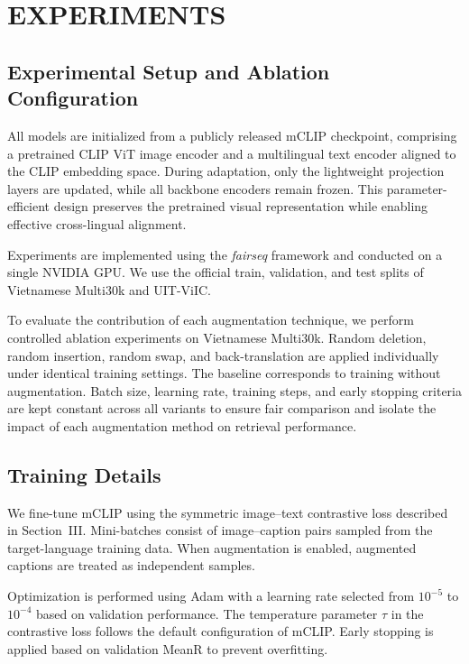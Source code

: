 \section{EXPERIMENTS}
\label{sec:experiments}
\subsection{Experimental Setup and Ablation Configuration}

All models are initialized from a publicly released mCLIP checkpoint, comprising a pretrained CLIP ViT image encoder and a multilingual text encoder aligned to the CLIP embedding space. During adaptation, only the lightweight projection layers are updated, while all backbone encoders remain frozen. This parameter-efficient design preserves the pretrained visual representation while enabling effective cross-lingual alignment.

Experiments are implemented using the \textit{fairseq} framework and conducted on a single NVIDIA GPU. We use the official train, validation, and test splits of Vietnamese Multi30k and UIT-ViIC.

To evaluate the contribution of each augmentation technique, we perform controlled ablation experiments on Vietnamese Multi30k. Random deletion, random insertion, random swap, and back-translation are applied individually under identical training settings. The baseline corresponds to training without augmentation. Batch size, learning rate, training steps, and early stopping criteria are kept constant across all variants to ensure fair comparison and isolate the impact of each augmentation method on retrieval performance.


\subsection{Training Details}

We fine-tune mCLIP using the symmetric image--text contrastive loss described in Section~III. Mini-batches consist of image--caption pairs sampled from the target-language training data. When augmentation is enabled, augmented captions are treated as independent samples.

Optimization is performed using Adam \cite{jais2019adam} with a learning rate selected from $10^{-5}$ to $10^{-4}$ based on validation performance. The temperature parameter $\tau$ in the contrastive loss follows the default configuration of mCLIP. Early stopping is applied based on validation MeanR to prevent overfitting.

